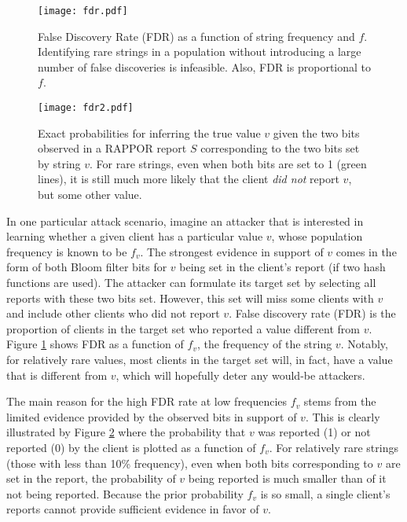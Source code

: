 \documentclass{sig-alternate-2013}
\newcommand\RAPPOR{{RAPPOR}}
\begin{document}
\begin{figure}[t]
\begin{center}
\texttt{[image: fdr.pdf]}
\caption{False Discovery Rate (FDR) as a function of string frequency and $f$. Identifying rare strings in a population without introducing a large number of false discoveries is infeasible. Also, FDR is proportional to $f$.}
\label{fig:fdr}
\end{center}
\end{figure}

\begin{figure}[t]
\begin{center}
\texttt{[image: fdr2.pdf]}
\caption{Exact probabilities for inferring the true value $v$ given the two bits observed in a \RAPPOR{} report $S$ corresponding to the two bits set by string $v$. For rare strings, even when both bits are set to 1 (green lines), it is still much more likely that the client \emph{did not} report $v$, but some other value.}
\label{fig:fdr2}
\end{center}
\end{figure}

In one particular attack scenario, 
imagine an attacker that is interested in learning whether a given client has a particular value $v$,
whose population frequency is known to be $f_v$. 
The strongest evidence in support of $v$ comes in the form of both Bloom filter bits for $v$ being set in the client's report (if two hash functions are used). 
The attacker can formulate its target set by selecting all reports with these two bits set. 
However, this set will miss some clients with $v$ and include other clients who did not report $v$. 
False discovery rate (FDR) is the proportion of clients in the target set who reported a value different from $v$. 
Figure \ref{fig:fdr} shows FDR as a function of $f_v$, the frequency of the string $v$.
Notably,
for relatively rare values, most clients in the target set will, in fact, have a value that is different from $v$,
which will hopefully deter any would-be attackers.

The main reason for the high FDR rate at low frequencies $f_v$ stems from the limited evidence provided by the observed bits in support of $v$. 
This is clearly illustrated by 
Figure \ref{fig:fdr2} where the probability that $v$ was reported (1) or not reported (0) by the client is plotted as a function of $f_v$. 
For relatively rare strings (those with less than 10\% frequency), even when both bits corresponding to $v$ are set in the report, 
the probability of $v$ being reported is much smaller than of it not being reported. 
Because the prior probability $f_v$ is so small, a single client's reports cannot provide sufficient evidence in favor of $v$.
\end{document}
